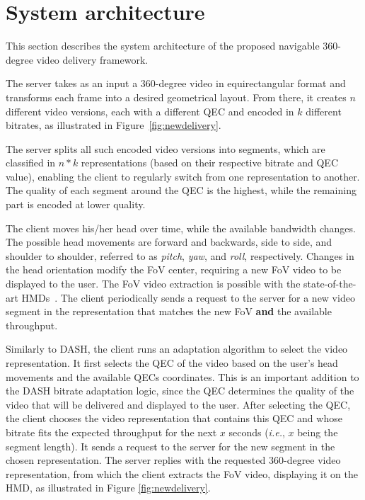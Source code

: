 \section{System architecture}

This section describes the system architecture of the proposed navigable 360-degree video delivery framework. %

 The server takes as an input a 360-degree video in equirectangular format and transforms each frame into a desired geometrical layout. From there, it creates $n$ different video versions, each with a different QEC and encoded in $k$ different bitrates, as illustrated in Figure~\ref{fig:newdelivery}.

The server splits all such encoded video versions into segments, which are classified in $n*k$ representations (based on their respective bitrate and QEC value), enabling the client to regularly switch from one representation to another. The quality of each segment around the QEC is the highest, while the remaining part is encoded at lower quality.

 The client moves his/her head over time, while the available bandwidth changes. The possible head movements are forward and backwards, side to side, and shoulder to shoulder, referred to as \emph{pitch}, \emph{yaw}, and \emph{roll}, respectively. Changes in the head orientation modify the FoV center, requiring a new FoV video to be displayed to the user. The FoV video extraction is possible with the state-of-the-art HMDs~\cite{fovhmds}. The client periodically sends a request to the server for a new video segment in the representation that matches the new FoV \textbf{and} the available throughput.

 Similarly to DASH, the client runs an adaptation algorithm to select the video representation.
It first selects the QEC of the video based on the user's head movements and the available QECs coordinates. This is an important addition to the DASH bitrate adaptation logic, since the QEC determines the quality of the video that will be delivered and displayed to the user. After selecting the QEC, the client chooses the video representation that contains this QEC and whose bitrate fits the expected throughput for the next $x$ seconds (\textit{i.e.}, $x$ being the segment length). It sends a request to the server for the new segment in the chosen representation. The server replies with the requested 360-degree video representation, from which the client extracts the FoV video, displaying it on the HMD, as illustrated in Figure \ref{fig:newdelivery}. %


